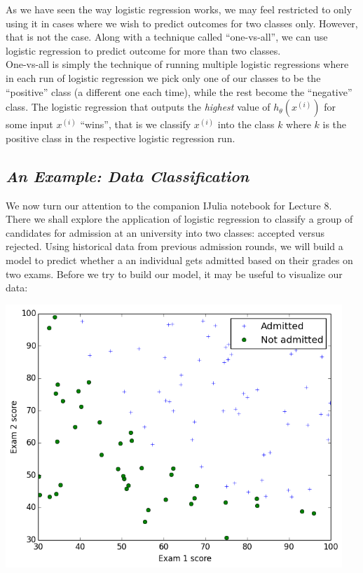 \documentclass[11pt,a4paper,oneside]{report}
\begin{document}
As we have seen the way logistic regression works, we may feel restricted to only using it in cases where we wish to predict outcomes for two classes only. However, that is not the case. Along with a technique called ``one-vs-all'', we can use logistic regression to predict outcome for more than two classes.\\

One-vs-all is simply the technique of running multiple logistic regressions where in each run of logistic regression we pick only one of our classes to be the ``positive'' class (a different one each time), while the rest become the ``negative'' class. The logistic regression that outputs the \emph{highest} value of $h_{\theta}(x^{(i)})$ for some input $x^{(i)}$ ``wins'', that is we classify $x^{(i)}$ into the class $k$ where $k$ is the positive class in the respective logistic regression run.\\


{\center\color{magenta}
\subsection*{\it\huge An Example: Data Classification}}

We now turn our attention to the companion IJulia notebook for Lecture 8. There we shall explore the application of logistic regression to classify a group of candidates for admission at an university into two classes: accepted versus rejected. Using historical data from previous admission rounds, we will build a model to predict whether a an individual gets admitted based on their grades on two exams. Before we try to build our model, it may be useful to visualize our data:

\begin{center}
\includegraphics[width=5in]{admissions.png}\\
\end{center}
\end{document}
